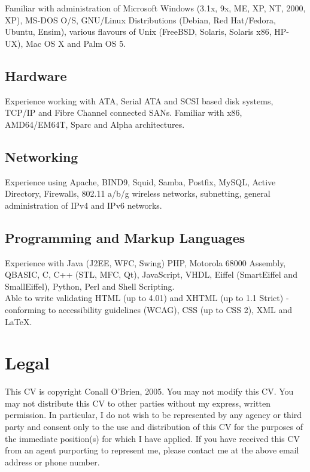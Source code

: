 \documentclass[a4paper, 11pt] {article}
\begin{document}
Familiar with administration of Microsoft Windows (3.1x, 9x, 
ME, XP, NT, 2000, XP), MS-DOS O/S, GNU/Linux Distributions (Debian, Red 
Hat/Fedora, Ubuntu, Ensim), various flavours of Unix (FreeBSD, Solaris, Solaris x86, 
HP-UX), Mac OS X and Palm OS 5. 

\subsection*{Hardware}

Experience working with ATA, Serial ATA and SCSI based disk systems, TCP/IP and 
Fibre Channel connected SANs. Familiar with x86, AMD64/EM64T, Sparc and
Alpha architectures.

\subsection*{Networking}

Experience using Apache, BIND9, Squid, Samba, Postfix, MySQL, Active 
Directory, Firewalls, 802.11 a/b/g wireless networks, subnetting, general
administration of IPv4 and IPv6 networks. 

\subsection*{Programming and Markup Languages}

Experience with Java (J2EE, WFC, Swing) PHP, Motorola 68000 Assembly, QBASIC,
C, C++ (STL, MFC, Qt), JavaScript, VHDL, Eiffel (SmartEiffel and 
SmallEiffel), Python, Perl and Shell Scripting. \\

Able to write validating HTML (up to 4.01) and XHTML (up 
to 1.1 Strict) - conforming to accessibility guidelines (WCAG), CSS (up to 
CSS 2), XML and LaTeX.

\section*{Legal}

This CV is copyright Conall O'Brien, 2005. You may not modify this
CV. You may not distribute this CV to other parties without my express,
written permission. In particular, I do not wish to be represented by
any agency or third party and consent only to the use and distribution
of this CV for the purposes of the immediate position(s) for which I
have applied. If you have received this CV from an agent purporting to
represent me, please contact me at the above email address or phone
number.
\end{document}

